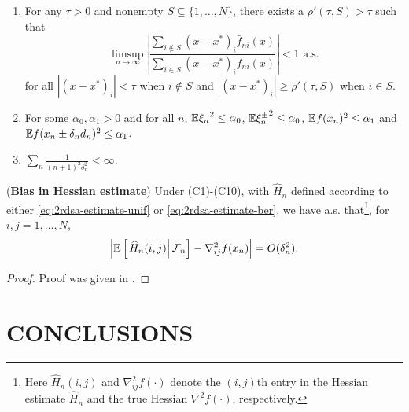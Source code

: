 \documentclass[letterpaper, 10 pt, conference]{ieeeconf}  %
\begin{document}
\begin{enumerate}[label=(\textbf{C\arabic*})]
\item For any $\tau >0$ and nonempty $S \subseteq \{1,\ldots,N\}$, there exists a $\rho'(\tau,S)>\tau$ such that 
$$ \limsup_{n\rightarrow \infty} \left| \dfrac{\sum_{i \notin S} (x-x^*)_i \bar f_{ni}(x)}{\sum_{i \in S} (x-x^*)_i \bar f_{ni}(x)}               \right| < 1 \text{ a.s.}$$
for all $|(x-x^*)_i| < \tau$ when $i \notin S$ and $|(x-x^*)_i| \ge \rho'(\tau,S)$ when $i\in S$.
\item For some $\alpha_0, \alpha_1>0$ and for all $n$, $\mathbb{E} {\xi_n}^{2} \le \alpha_0$, $\mathbb{E} {\xi_n^{\pm}}^{2} \le \alpha_0$, $\mathbb{E} f(x_n)^{2} \le \alpha_1$ and $\mathbb{E} f(x_n\pm \delta_n d_n)^{2} \le \alpha_1$. 
\item  $\sum_n \frac{1}{(n+1)^{2}\delta_n^{2}} < \infty$.
\end{enumerate}
\begin{lemma}(\textbf{Bias in Hessian estimate})
\label{lemma:2rdsa-bias}
Under (C1)-(C10), with $\widehat H_n$ defined according to either \eqref{eq:2rdsa-estimate-unif} or \eqref{eq:2rdsa-estimate-ber}, we have a.s. that\footnote{Here $\widehat H_n(i,j)$ and $\nabla^2_{ij}f(\cdot)$ denote the $(i,j)$th entry in the Hessian estimate $\widehat H_n$ and the true Hessian $\nabla^2 f(\cdot)$, respectively.}, for $i,j = 1,\ldots,N$,
\begin{align}
\left|\mathbb{E}\left[
\left. \widehat H_n(i,j) \right| \mathcal{F}_n \right] - \nabla^2_{ij} f(x_n)\right| = O(\delta_n^2).
\end{align} 
\end{lemma}
\begin{proof}
Proof was given in \cite{prashanth2015rdsa}.
\end{proof}

















\section{CONCLUSIONS}


\addtolength{\textheight}{-12cm}   %
\end{document}
